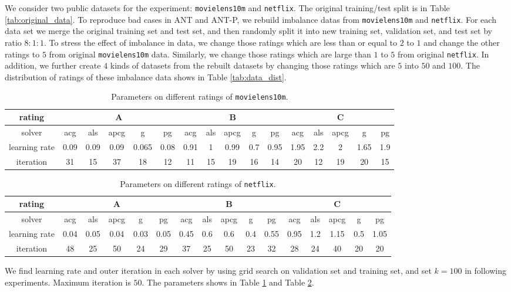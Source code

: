 \documentclass[11pt,twoside]{article}
\begin{document}
We consider two public datasets for the experiment:  {\tt movielens10m} and {\tt netflix}. The
original training/test split is in Table \ref{tab:original_data}.
To reproduce bad cases in ANT and ANT-P, we rebuild imbalance datas from {\tt movielens10m} and {\tt netflix}. 
For each data set we merge the original training set and test set, and then randomly split it into new training set, validation set, and test set by ratio $8:1:1$. To stress the effect of imbalance in data, we change those ratings which are less than or equal to $2$ to $1$ and change the other ratings to $5$ from original {\tt movielens10m} data. Similarly, we change those ratings which are large than $1$ to $5$ from original {\tt netflix}. In addition, we further create $4$ kinds of datasets from the rebuilt datasets by changing those ratings which are $5$ into $50$ and $100$. The distribution of ratings of these imbalance data shows in Table \ref{tab:data_dist}.
\begin{table}[H]
    \centering    
    \begin{tabular}{c|ccccc|ccccc|ccccc}
rating        & \multicolumn{5}{c|}{A}            & \multicolumn{5}{c|}{B}    & \multicolumn{5}{c}{C}     \\ \hline
solver        & acg  & als  & apcg & g     & pg   & acg & als & apcg & g & pg & acg & als & apcg & g & pg \\ \hline
learning rate & 0.09 & 0.09 & 0.09 & 0.065 & 0.08 & 0.91   & 1   & 0.99    & 0.7 & 0.95  & 1.95   & 2.2   & 2    & 1.65 & 1.9  \\
iteration     & 31   & 15   & 37   & 18    & 12   & 11   & 15   & 19    & 16 & 14  & 20   & 12   & 19    & 20 & 15 
\end{tabular}
    \caption{Parameters on different ratings of {\tt movielens10m}.}
    \label{tab:parameters_ml}
\end{table}
\begin{table}[H]
    \centering    
    \begin{tabular}{c|ccccc|ccccc|ccccc}
rating        & \multicolumn{5}{c|}{A}    & \multicolumn{5}{c|}{B}    & \multicolumn{5}{c}{C}     \\ \hline
solver        & acg & als & apcg & g & pg & acg & als & apcg & g & pg & acg & als & apcg & g & pg \\ \hline
learning rate & 0.04   & 0.05   & 0.04    & 0.03 & 0.05  & 0.45   & 0.6   & 0.6    & 0.4 & 0.55  & 0.95   & 1.2   & 1.15    & 0.5 & 1.05  \\
iteration     & 48   & 25   & 50    & 24 & 29  & 37   & 25   & 50    & 23 & 32  & 28   & 24   & 40    & 20 & 20 
\end{tabular}
    \caption{Parameters on different ratings of {\tt netflix}.}
    \label{tab:parameters_nf}
\end{table}
We find learning rate and outer iteration in each solver by using grid search on validation set and training set, and set $k=100$ in following experiments. Maximum iteration is $50$. The parameters shows in Table \ref{tab:parameters_ml} and Table \ref{tab:parameters_nf}.
\end{document}
